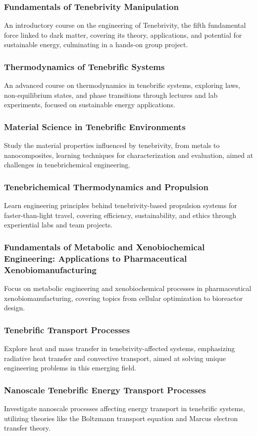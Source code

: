 \subsubsection{Fundamentals of Tenebrivity Manipulation}
An introductory course on the engineering of Tenebrivity, the fifth fundamental force linked to dark matter, covering its theory, applications, and potential for sustainable energy, culminating in a hands-on group project.
\subsubsection{Thermodynamics of Tenebrific Systems}
An advanced course on thermodynamics in tenebrific systems, exploring laws, non-equilibrium states, and phase transitions through lectures and lab experiments, focused on sustainable energy applications.
\subsubsection{Material Science in Tenebrific Environments}
Study the material properties influenced by tenebrivity, from metals to nanocomposites, learning techniques for characterization and evaluation, aimed at challenges in tenebrichemical engineering.
\subsubsection{Tenebrichemical Thermodynamics and Propulsion}
Learn engineering principles behind tenebrivity-based propulsion systems for faster-than-light travel, covering efficiency, sustainability, and ethics through experiential labs and team projects.
\subsubsection{Fundamentals of Metabolic and Xenobiochemical Engineering: Applications to Pharmaceutical Xenobiomanufacturing}
Focus on metabolic engineering and xenobiochemical processes in pharmaceutical xenobiomanufacturing, covering topics from cellular optimization to bioreactor design.
\subsubsection{Tenebrific Transport Processes}
Explore heat and mass transfer in tenebrivity-affected systems, emphasizing radiative heat transfer and convective transport, aimed at solving unique engineering problems in this emerging field.
\subsubsection{Nanoscale Tenebrific Energy Transport Processes}
Investigate nanoscale processes affecting energy transport in tenebrific systems, utilizing theories like the Boltzmann transport equation and Marcus electron transfer theory.
